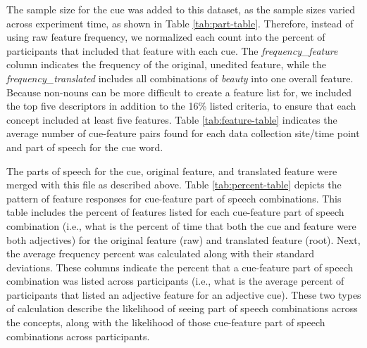 \documentclass[english,,man]{apa6}
\theoremstyle{definition}
\theoremstyle{definition}
\theoremstyle{definition}
\theoremstyle{remark}
\begin{document}
The sample size for the cue was added to this dataset, as the sample
sizes varied across experiment time, as shown in Table
\ref{tab:part-table}. Therefore, instead of using raw feature frequency,
we normalized each count into the percent of participants that included
that feature with each cue. The \emph{frequency\_feature} column
indicates the frequency of the original, unedited feature, while the
\emph{frequency\_translated} includes all combinations of \emph{beauty}
into one overall feature. Because non-nouns can be more difficult to
create a feature list for, we included the top five descriptors in
addition to the 16\% listed criteria, to ensure that each concept
included at least five features. Table \ref{tab:feature-table} indicates
the average number of cue-feature pairs found for each data collection
site/time point and part of speech for the cue word.

The parts of speech for the cue, original feature, and translated
feature were merged with this file as described above. Table
\ref{tab:percent-table} depicts the pattern of feature responses for
cue-feature part of speech combinations. This table includes the percent
of features listed for each cue-feature part of speech combination
(i.e., what is the percent of time that both the cue and feature were
both adjectives) for the original feature (raw) and translated feature
(root). Next, the average frequency percent was calculated along with
their standard deviations. These columns indicate the percent that a
cue-feature part of speech combination was listed across participants
(i.e., what is the average percent of participants that listed an
adjective feature for an adjective cue). These two types of calculation
describe the likelihood of seeing part of speech combinations across the
concepts, along with the likelihood of those cue-feature part of speech
combinations across participants.
\end{document}
